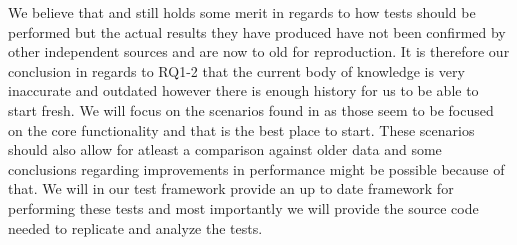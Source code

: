 We believe that \cite{Sanjay2011} and \cite{Perera07,Perera07R2,Perera07R3,mulesoft08} still holds some merit in regards to how tests should be performed but the actual results they have produced have not been confirmed by other independent sources and are now to old for reproduction. 
It is therefore our conclusion in regards to RQ1-2 that the current body of knowledge is very inaccurate and outdated however there is enough history for us to be able to start fresh.
We will focus on the scenarios found in \cite{Perera07,Perera07R2,Perera07R3,mulesoft08,Sanjay2011} as those seem to be focused on the core functionality and that is the best place to start.
These scenarios should also allow for atleast a comparison against older data and some conclusions regarding improvements in performance might be possible because of that.
We will in our test framework provide an up to date framework for performing these tests and most importantly we will provide the source code needed to replicate and analyze the tests.

